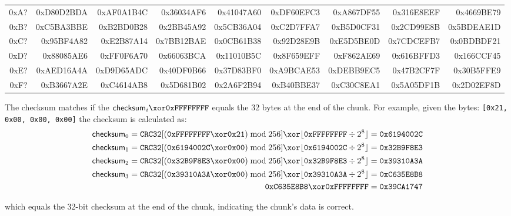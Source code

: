 \begin{table}[h]
{\begin{tabular}{|r||r|r|r|r|r|r|r|r|}
0xA? &
0xD80D2BDA &  0xAF0A1B4C &  0x36034AF6 &  0x41047A60 &  0xDF60EFC3 &  0xA867DF55 &  0x316E8EEF &  0x4669BE79 \\
0xB? &
0xC5BA3BBE &  0xB2BD0B28 &  0x2BB45A92 &  0x5CB36A04 &  0xC2D7FFA7 &  0xB5D0CF31 &  0x2CD99E8B &  0x5BDEAE1D \\
0xC? &
0x95BF4A82 &  0xE2B87A14 &  0x7BB12BAE &  0x0CB61B38 &  0x92D28E9B &  0xE5D5BE0D &  0x7CDCEFB7 &  0x0BDBDF21 \\
0xD? &
0x88085AE6 &  0xFF0F6A70 &  0x66063BCA &  0x11010B5C &  0x8F659EFF &  0xF862AE69 &  0x616BFFD3 &  0x166CCF45 \\
0xE? &
0xAED16A4A &  0xD9D65ADC &  0x40DF0B66 &  0x37D83BF0 &  0xA9BCAE53 &  0xDEBB9EC5 &  0x47B2CF7F &  0x30B5FFE9 \\
0xF? &
0xB3667A2E &  0xC4614AB8 &  0x5D681B02 &  0x2A6F2B94 &  0xB40BBE37 &  0xC30C8EA1 &  0x5A05DF1B &  0x2D02EF8D \\
\hline
\end{tabular}
}
\end{table}
\par
\noindent
The checksum matches if the $\textsf{checksum}_i \xor \texttt{0xFFFFFFFF}$
equals the 32 bytes at the end of the chunk.
For example, given the bytes: \texttt{[0x21, 0x00, 0x00, 0x00]}
the checksum is calculated as:
{
  \begin{align*}
    \textsf{checksum}_0 = \texttt{CRC32}[(\texttt{0xFFFFFFFF} \xor \texttt{0x21}) \bmod 256] \xor \lfloor\texttt{0xFFFFFFFF} \div 2 ^ 8\rfloor &= \texttt{0x6194002C} \\
    \textsf{checksum}_1 = \texttt{CRC32}[(\texttt{0x6194002C} \xor \texttt{0x00}) \bmod 256] \xor \lfloor\texttt{0x6194002C} \div 2 ^ 8\rfloor &= \texttt{0x32B9F8E3} \\
    \textsf{checksum}_2 = \texttt{CRC32}[(\texttt{0x32B9F8E3} \xor \texttt{0x00}) \bmod 256] \xor \lfloor\texttt{0x32B9F8E3} \div 2 ^ 8\rfloor &= \texttt{0x39310A3A} \\
    \textsf{checksum}_3 = \texttt{CRC32}[(\texttt{0x39310A3A} \xor \texttt{0x00}) \bmod 256] \xor \lfloor\texttt{0x39310A3A} \div 2 ^ 8\rfloor &= \texttt{0xC635E8B8} \\
    \texttt{0xC635E8B8} \xor \texttt{0xFFFFFFFF} &= \texttt{0x39CA1747} \\
  \end{align*}
}
\par
\noindent
which equals the 32-bit checksum at the end of the chunk,
indicating the chunk's data is correct.
